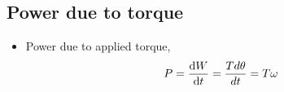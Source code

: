 \documentclass{article}
\begin{document}
	\subsection{Power due to torque}
	\begin{itemize}
		\item Power due to applied torque,
		\[P = \dv{W}{t} = \frac{Td\theta}{dt} = T\omega\]

	\end{itemize}






\end{document}
